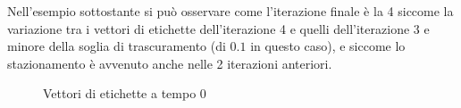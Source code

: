 \documentclass[a4paper,12pt]{report}
\begin{document}
		Nell'esempio sottostante si può osservare come l'iterazione finale è la 4 siccome la variazione tra i vettori di etichette dell'iterazione 4 e quelli dell'iterazione 3 e minore della soglia di trascuramento (di $0.1$ in questo caso), e siccome lo stazionamento è avvenuto anche nelle 2 iterazioni anteriori.
		\begin{center}
			\begin{figure}[H]
				\centering
				\qquad
				\qquad
				\qquad

				\caption{Vettori di etichette a tempo 0}
			\end{figure}
		\end{center}
\end{document}
